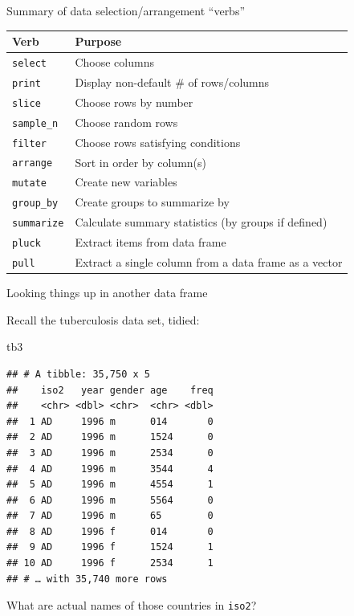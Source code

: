\documentclass[
  ignorenonframetext,
]{beamer}
\newenvironment{Shaded}{\begin{snugshade}}{\end{snugshade}}
\newcommand{\NormalTok}[1]{#1}
\begin{document}
\begin{frame}{Summary of data selection/arrangement ``verbs''}
\protect\hypertarget{summary-of-data-selectionarrangement-verbs}{}

\begin{tabular}{lp{}}
    Verb & Purpose\\
    \hline
    \texttt{select} & Choose columns\\
    \texttt{print} & Display non-default \# of rows/columns \\
    \texttt{slice} & Choose rows by number\\
    \texttt{sample\_n} & Choose random rows\\ 
    \texttt{filter} & Choose rows satisfying conditions \\
    \texttt{arrange}& Sort in order by column(s) \\
    \texttt{mutate} & Create new variables\\
    \texttt{group\_by} & Create groups to summarize by\\
    \texttt{summarize} & Calculate summary statistics (by groups if defined)\\
    \texttt{pluck} & Extract items from data frame\\
    \texttt{pull} & Extract a single column from a data frame as a vector\\
    \hline
  \end{tabular}

\end{frame}

\begin{frame}[fragile]{Looking things up in another data frame}
\protect\hypertarget{looking-things-up-in-another-data-frame}{}

Recall the tuberculosis data set, tidied:

\begin{Shaded}
\begin{Highlighting}[]
\NormalTok{tb3}
\end{Highlighting}
\end{Shaded}

\begin{verbatim}
## # A tibble: 35,750 x 5
##    iso2   year gender age    freq
##    <chr> <dbl> <chr>  <chr> <dbl>
##  1 AD     1996 m      014       0
##  2 AD     1996 m      1524      0
##  3 AD     1996 m      2534      0
##  4 AD     1996 m      3544      4
##  5 AD     1996 m      4554      1
##  6 AD     1996 m      5564      0
##  7 AD     1996 m      65        0
##  8 AD     1996 f      014       0
##  9 AD     1996 f      1524      1
## 10 AD     1996 f      2534      1
## # … with 35,740 more rows
\end{verbatim}

What are actual names of those countries in \texttt{iso2}?

\end{frame}
\end{document}

